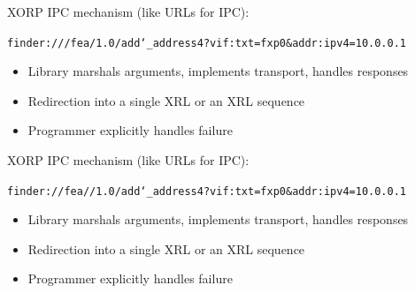 \documentclass[landscape]{icsislides}
\begin{document}
\begin{slide}

XORP IPC mechanism (like URLs for IPC):

\begin{center}
\texttt{finder:///fea/1.0/add\char`\_address4?vif:txt=fxp0\&addr:ipv4=10.0.0.1}
\vskip20pt
\end{center}

\begin{itemize}
  \item Library marshals arguments, implements transport, handles responses
  \item Redirection into a single XRL or an XRL sequence
  \item Programmer explicitly handles failure
\end{itemize}

\end{slide}

\begin{slide}

XORP IPC mechanism (like URLs for IPC):

\begin{center}
\texttt{finder://fea//1.0/add\char`\_address4?vif:txt=fxp0\&addr:ipv4=10.0.0.1}
\vskip20pt
\end{center}

\begin{itemize}
  \item Library marshals arguments, implements transport, handles responses
  \item Redirection into a single XRL or an XRL sequence
  \item Programmer explicitly handles failure
\end{itemize}

\end{slide}
\end{document}
